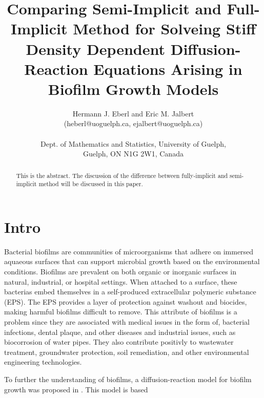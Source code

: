 \documentclass{article}
\begin{document}
\title{Comparing Semi-Implicit and Full-Implicit Method for Solveing Stiff Density Dependent Diffusion-Reaction Equations Arising in Biofilm Growth Models}
\author{Hermann J. Eberl and Eric M. Jalbert\\
  (heberl@uoguelph.ca, ejalbert@uoguelph.ca)\\ \\
  Dept. of Mathematics and Statistics, University of Guelph,\\ 
  Guelph, ON N1G 2W1, Canada}
\maketitle

\begin{abstract}
  This is the abstract. The discussion of the difference between fully-implicit and semi-implicit method will be discussed in this paper.
\end{abstract}

\section{Intro}
  Bacterial biofilms are communities of microorganisms that adhere on immersed aquaeous surfaces that can support microbial growth based on the environmental conditions. 
  Biofilms are prevalent on both organic or inorganic surfaces in natural, industrial, or hospital settings.
  When attached to a surface, these bacterias embed themselves in a self-produced extracellular polymeric substance (EPS).
  The EPS provides a layer of protection against washout and biocides, making harmful biofilms difficult to remove.
  This attribute of biofilms is a problem since they are associated with medical issues in the form of, bacterial infections, dental plaque, and other diseases and industrial issues, such as biocorrosion of water pipes. 
  They also contribute positivly to wastewater treatment, groundwater protection, soil remediation, and other environmental engineering technologies.
  
  
  To further the understanding of biofilms, a diffusion-reaction model for biofilm growth was proposed in \cite{eberl2001deterministic}.
  This model is based 
  
 
   
 
\end{document}

